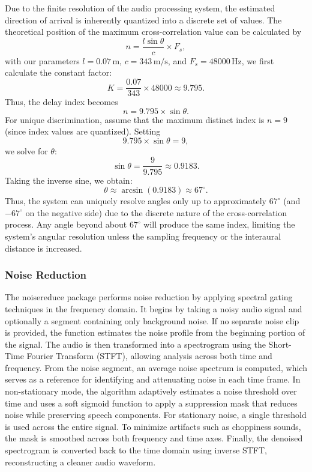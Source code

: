 \documentclass{CSSRforAfrica}
\begin{document}
Due to the finite resolution of the audio processing system, the estimated direction of arrival is inherently quantized into a discrete set of values. 
The theoretical position of the maximum cross-correlation value can be calculated by
\[
n = \frac{l \sin \theta}{c} \times F_s,
\]
with our parameters \(l = 0.07\,\text{m}\), \(c = 343\,\text{m/s}\), and \(F_s = 48000\,\text{Hz}\), we first calculate the constant factor:
\[
K = \frac{0.07}{343} \times 48000 \approx 9.795.
\]
Thus, the delay index becomes
\[
n = 9.795 \times \sin \theta.
\]
For unique discrimination, assume that the maximum distinct index is \(n = 9\) (since index values are quantized). Setting
\[
9.795 \times \sin \theta = 9,
\]
we solve for \(\theta\):
\[
\sin \theta = \frac{9}{9.795} \approx 0.9183.
\]
Taking the inverse sine, we obtain:
\[
\theta \approx \arcsin(0.9183) \approx 67^\circ.
\]
Thus, the system can uniquely resolve angles only up to approximately \(67^\circ\) (and \(-67^\circ\) on the negative side) due to the discrete nature of the cross-correlation process. Any angle beyond about \(67^\circ\) will produce the same index, limiting the system's angular resolution unless the sampling frequency or the interaural distance is increased.\\

\subsubsection*{Noise Reduction}
The noisereduce package performs noise reduction by applying spectral gating techniques in the frequency domain. It begins by taking a noisy audio signal and optionally a segment containing only background noise. If no separate noise clip is provided, the function estimates the noise profile from the beginning portion of the signal. The audio is then transformed into a spectrogram using the Short-Time Fourier Transform (STFT), allowing analysis across both time and frequency. From the noise segment, an average noise spectrum is computed, which serves as a reference for identifying and attenuating noise in each time frame. In non-stationary mode, the algorithm adaptively estimates a noise threshold over time and uses a soft sigmoid function to apply a suppression mask that reduces noise while preserving speech components. For stationary noise, a single threshold is used across the entire signal. To minimize artifacts such as choppiness sounds, the mask is smoothed across both frequency and time axes. Finally, the denoised spectrogram is converted back to the time domain using inverse STFT, reconstructing a cleaner audio waveform. \\
\end{document}
